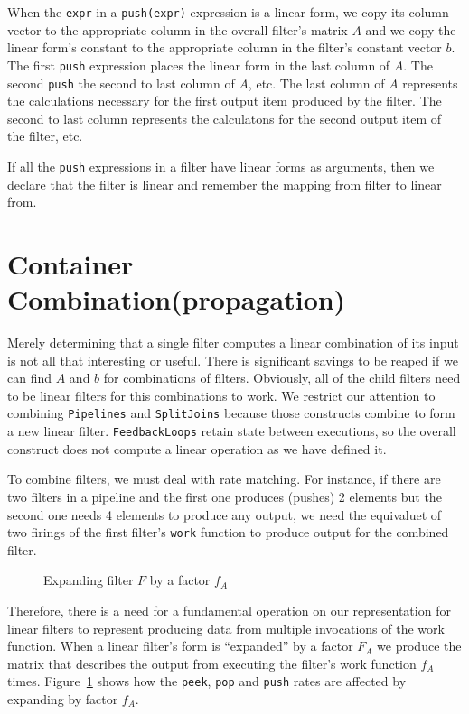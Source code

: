 When the {\tt expr} in a {\tt push(expr)} expression is a linear form, we copy its column
vector to the appropriate column in the overall filter's matrix $A$ and we copy the
linear form's constant to the appropriate column in the filter's constant vector $b$.
The first {\tt push} expression places the linear form in the last column of $A$. The second
{\tt push} the second to last column of $A$, etc. The last column of $A$ represents the 
calculations necessary for the first output item produced by the filter. The second to last
column represents the calculatons for the second output item of the filter, etc.

If all the {\tt push} expressions in a filter have linear forms as arguments, then we declare
that the filter is linear and remember the mapping from filter to linear from.

\section{Container Combination(propagation)}
Merely determining that a single filter computes a linear combination of its input is not
all that interesting or useful. There is significant savings to be reaped if we can
find $A$ and $b$ for combinations of filters. Obviously, all of the child filters need
to be linear filters for this combinations to work. We restrict our attention to combining
{\tt Pipelines} and {\tt SplitJoins} because those constructs combine to form a new linear filter. 
{\tt FeedbackLoops} retain state between executions, so the overall construct 
does not compute a linear operation as we have defined it. 

To combine filters, we must deal with rate matching. For instance, if there are two
filters in a pipeline and the first one produces (pushes) 2 elements but the second one
needs 4 elements to produce any output, we need the equivaluet of two firings of the
first filter's {\tt work} function to produce output for the combined filter. 

\begin{figure}
\center
\epsfxsize=3.0in
\caption{Expanding filter $F$ by a factor $f_{A}$}
\label{fig:expanding-a-filter}
\end{figure}


Therefore, there is a need for a fundamental operation on our representation for 
linear filters to represent producing data from multiple invocations of the work
function. When a linear filter's form is ``expanded'' by a factor $F_{A}$ 
we produce the matrix that describes the output from executing the filter's work
function $f_{A}$ times. Figure~\ref{fig:expanding-a-filter} shows how the {\tt peek},
{\tt pop} and  {\tt push} rates are affected by expanding by factor $f_{A}$.

